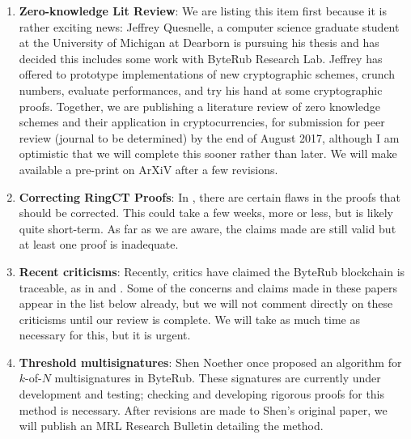 \documentclass[12pt,english]{mrl}
\theoremstyle{definition}
\numberwithin{equation}{section}
\numberwithin{figure}{section}
\numberwithin{equation}{section}
\numberwithin{equation}{section}
\numberwithin{figure}{section}
\begin{document}
\begin{enumerate}[1.]

    \item \textbf{Zero-knowledge Lit Review}: We are listing this item first because it is rather exciting news: Jeffrey Quesnelle, a computer science graduate student at the University of Michigan at Dearborn is pursuing his thesis and has decided this includes some work with ByteRub Research Lab. Jeffrey has offered to prototype implementations of new cryptographic schemes, crunch numbers, evaluate performances, and try his hand at some cryptographic proofs. Together, we are publishing a literature review of zero knowledge schemes and their application in cryptocurrencies, for submission for peer review (journal to be determined) by the end of August 2017, although I am optimistic that we will complete this sooner rather than later. We will make available a pre-print on ArXiV after a few revisions.
    
    
    \item \textbf{Correcting RingCT Proofs}: In \cite{noether2016ring}, there are certain flaws in the proofs that should be corrected. This could take a few weeks, more or less, but is likely quite short-term. As far as we are aware, the claims made are still valid but at least one proof is inadequate.
    
    \item \textbf{Recent criticisms}: Recently, critics have claimed the ByteRub blockchain is traceable, as in \cite{miller2017empirical} and \cite{kumar2017traceability}. Some of the concerns and claims made in these papers appear in the list below already, but we will not comment directly on these criticisms until our review is complete. We will take as much time as necessary for this, but it is urgent.
    
    \item \textbf{Threshold multisignatures}: Shen Noether once proposed an algorithm for  $k$-of-$N$ multisignatures in ByteRub.  These signatures are currently under development and testing; checking and developing rigorous proofs for this method is necessary. After revisions are made to Shen's original paper, we will publish an MRL Research Bulletin detailing the method.
    
    
    
    
    

\end{enumerate}
\end{document}
